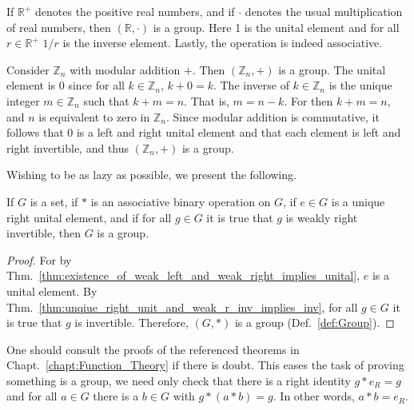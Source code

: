         \begin{example}
            If $\mathbb{R}^{+}$ denotes the positive real numbers, and if
            $\cdot$ denotes the usual multiplication of real numbers, then
            $(\mathbb{R},\cdot)$ is a group. Here 1 is the unital element and
            for all $r\in\mathbb{R}^{+}$ $1/r$ is the inverse element. Lastly,
            the operation is indeed associative.
        \end{example}
        \begin{example}
            Consider $\mathbb{Z}_{n}$ with modular addition $+$. Then
            $(\mathbb{Z}_{n},+)$ is a group. The unital element is $0$ since for
            all $k\in\mathbb{Z}_{n}$, $k+0=k$. The inverse of
            $k\in\mathbb{Z}_{n}$ is the unique integer $m\in\mathbb{Z}_{n}$ such
            that $k+m=n$. That is, $m=n-k$. For then $k+m=n$, and $n$ is
            equivalent to zero in $\mathbb{Z}_{n}$. Since modular addition is
            commutative, it follows that $0$ is a left and right unital element
            and that each element is left and right invertible, and thus
            $(\mathbb{Z}_{n},+)$ is a group.
        \end{example}
        Wishing to be as lazy as possible, we present the following.
        \begin{theorem}
            If $G$ is a set, if $*$ is an associative binary operation on $G$,
            if $e\in{G}$ is a unique right unital element, and if for all
            $g\in{G}$ it is true that $g$ is weakly right invertible, then $G$
            is a group.
        \end{theorem}
        \begin{proof}
            For by
            Thm.~\ref{thm:existence_of_weak_left_and_weak_right_implies_unital},
            $e$ is a unital element. By
            Thm.~\ref{thm:unqiue_right_unit_and_weak_r_inv_implies_inv}, for all
            $g\in{G}$ it is true that $g$ is invertible. Therefore, $(G,*)$ is a
            group (Def.~\ref{def:Group}).
        \end{proof}
        One should consult the proofs of the referenced theorems in
        Chapt.~\ref{chapt:Function_Theory} if there is doubt. This eases the
        task of proving something is a group, we need only check that there is a
        right identity $g*e_{R}=g$ and for all $a\in{G}$ there is a $b\in{G}$
        with $g*(a*b)=g$. In other words, $a*b=e_{R}$.
        \par\hfill\par
